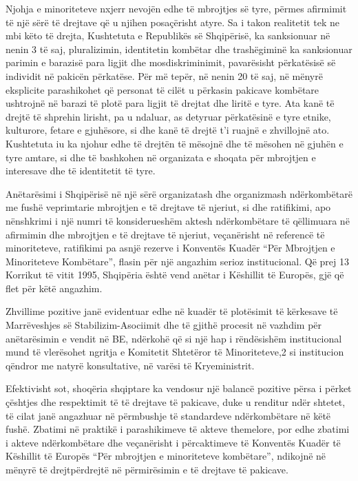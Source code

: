 \documentclass[a4paper]{article}
\begin{document}
Njohja e minoriteteve nxjerr nevojën edhe të mbrojtjes së tyre, përmes  afirmimit të një sërë të drejtave që u njihen posaçërisht atyre. Sa i takon realitetit  tek ne mbi këto të drejta, Kushtetuta e Republikës së Shqipërisë, ka  sanksionuar në nenin 3 të saj, pluralizimin, identitetin kombëtar dhe  trashëgiminë  ka  sanksionuar  parimin  e  barazisë  para  ligjit  dhe  mosdiskriminimit, pavarësisht përkatësisë së individit në pakicën përkatëse.  Për më tepër, në nenin 20 të saj, në mënyrë eksplicite parashikohet që  personat të cilët u përkasin pakicave kombëtare ushtrojnë në barazi të plotë  para ligjit të drejtat dhe liritë e tyre. Ata kanë të drejtë të shprehin lirisht, pa u  ndaluar, as detyruar përkatësinë e tyre etnike, kulturore, fetare e gjuhësore,  si dhe kanë të drejtë t’i ruajnë e zhvillojnë ato. Kushtetuta iu ka njohur edhe të  drejtën të mësojnë dhe të mësohen në gjuhën e tyre amtare, si dhe të  bashkohen në organizata e shoqata për mbrojtjen e interesave dhe të identitetit  të tyre.

Anëtarësimi i Shqipërisë në një sërë organizatash dhe organizmash  ndërkombëtarë me fushë veprimtarie mbrojtjen e të drejtave të njeriut, si dhe  ratifikimi, apo nënshkrimi i një numri të konsiderueshëm aktesh ndërkombëtare  të qëllimuara në afirmimin dhe mbrojtjen e të drejtave të njeriut, veçanërisht në  referencë të minoriteteve, ratifikimi pa asnjë rezerve i Konventës Kuadër “Për  Mbrojtjen e Minoriteteve Kombëtare”, flasin për një angazhim serioz  institucional. Që prej 13 Korrikut të vitit 1995, Shqipëria është vend anëtar i  Këshillit të Europës, gjë që flet për këtë angazhim.

Zhvillime pozitive janë evidentuar edhe në kuadër të plotësimit të  kërkesave të Marrëveshjes së Stabilizim-Asociimit dhe të gjithë procesit në  vazhdim për anëtarësimin e vendit në BE, ndërkohë që si një hap i  rëndësishëm institucional mund të vlerësohet ngritja e Komitetit Shtetëror të  Minoriteteve,2 si institucion qëndror me natyrë konsultative, në varësi të  Kryeministrit.

Efektivisht sot, shoqëria shqiptare ka vendosur një balancë pozitive  përsa i përket çështjes dhe respektimit të të drejtave të pakicave, duke u  renditur ndër shtetet, të cilat janë angazhuar në përmbushje të standardeve  ndërkombëtare në këtë fushë. Zbatimi në praktikë i parashikimeve të akteve  themelore, por edhe zbatimi i akteve ndërkombëtare dhe veçanërisht i  përcaktimeve të Konventës Kuadër të Këshillit të Europës “Për mbrojtjen e  minoriteteve kombëtare”, ndikojnë në mënyrë të drejtpërdrejtë në përmirësimin  e të drejtave të pakicave.
\end{document}
